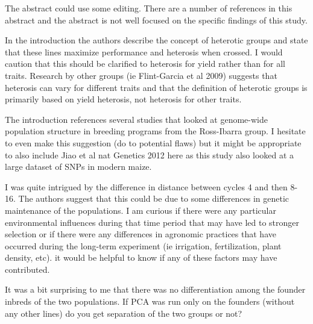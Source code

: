 \documentclass[onecolumn,oneside,letterpaper]{article}
\begin{document}
The abstract could use some editing.  There are a number of references in this 
abstract and the abstract is not well focused on the specific findings of this 
study.  


In the introduction the authors describe the concept of heterotic groups and 
state that these lines maximize performance and heterosis when crossed.  I would 
caution that this should be clarified to heterosis for yield rather than for all 
traits. Research by other groups (ie Flint-Garcia et al 2009) suggests that 
heterosis can vary for different traits and that the definition of heterotic 
groups is primarily based on yield heterosis, not heterosis for other traits.  


The introduction references several studies that looked at genome-wide 
population structure in breeding programs from the Ross-Ibarra group.  I 
hesitate to even make this suggestion (do to potential flaws) but it might be 
appropriate to also include Jiao et al nat Genetics 2012 here as this study also 
looked at a large dataset of SNPs in modern maize. 


I was quite intrigued by the difference in distance between cycles 4 and then 8-
16.  The authors suggest that this could be due to some differences in genetic 
maintenance of the populations.  I am curious if there were any particular 
environmental influences during that time period that may have led to stronger 
selection or if there were any differences in agronomic practices that have 
occurred during the long-term experiment (ie irrigation, fertilization, plant 
density, etc).  it would be helpful to know if any of these factors may have 
contributed.


It was a bit surprising to me that there was no differentiation among the 
founder inbreds of the two populations.  If PCA was run only on the founders 
(without any other lines) do you get separation of the two groups or not?

\end{document}
